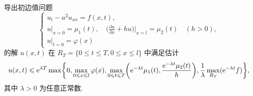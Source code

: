 \begin{exercise}
  导出初边值问题
  \[\begin{cases}
    u_t - a^2 u_{xx} = f(x,t), \\
    u|_{x=0} = \mu_1(t),\quad
      \bigl(\frac{\partial u}{\partial x} + hu\bigr)\big|_{x=l} = \mu_2(t)\quad (h>0), \\
    u|_{t=0} = \varphi(x)
  \end{cases}\]
  的解 $u(x,t)$ 在 $R_T=\{0\leq t\leq T, 0\leq x\leq l\}$ 中满足估计
  \[u(x,t) \leqslant \mathrm{e}^{\lambda T} \max\biggl\{
    0, \max_{0\leqslant x\leqslant l} \varphi(x),
    \max_{0\leqslant t\leqslant T} \biggl(\mathrm{e}^{-\lambda t}\mu_1(t),
      \frac{\mathrm{e}^{-\lambda t}\mu_2(t)}{h}\biggr),
      \frac{1}{\lambda} \max_{R_T} (\mathrm{e}^{-\lambda t}f)
  \biggr\},\]
  其中 $\lambda>0$ 为任意正常数.
\end{exercise}

